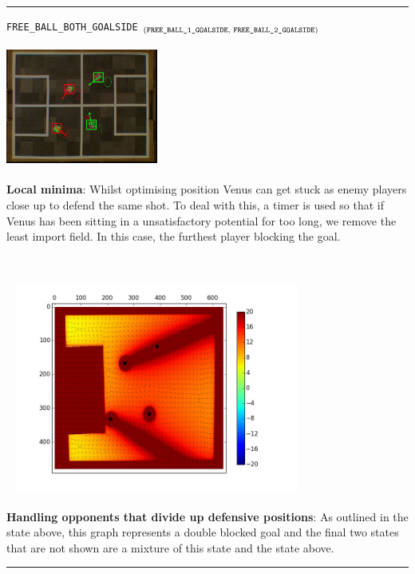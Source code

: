 \documentclass[a4paper,12pt]{article}
\begin{document}
\begin{minipage}{\linewidth}
\rule{\textwidth}{1pt}
\texttt{FREE\_BALL\_BOTH\_GOALSIDE} $_{\text{(\texttt{FREE\_BALL\_1\_GOALSIDE}, \texttt{FREE\_BALL\_2\_GOALSIDE})}}$\medskip

\begin{minipage}{0.5\textwidth}
\begin{center}
\includegraphics[height=40mm,width=50mm]{v5.jpg}\medskip
\end{center}

\textbf{Local minima}: Whilst optimising position Venus can get stuck as enemy players close up to defend the same shot. To deal with this, a timer is used so that if Venus has been sitting in a unsatisfactory potential for too long, we remove the least import field. In this case, the furthest player blocking the goal.
\end{minipage}
~
\begin{minipage}{0.5\textwidth}
\includegraphics[height=70mm,width=100mm,trim=65 55 65 35,clip]{p5.jpg}\medskip

\textbf{Handling opponents that divide up defensive positions}: As outlined in the state above, this graph represents a double blocked goal and the final two states that are not shown are a mixture of this state and the state above.
\end{minipage}
\end{minipage}

\rule{\textwidth}{1pt}
\end{document}
